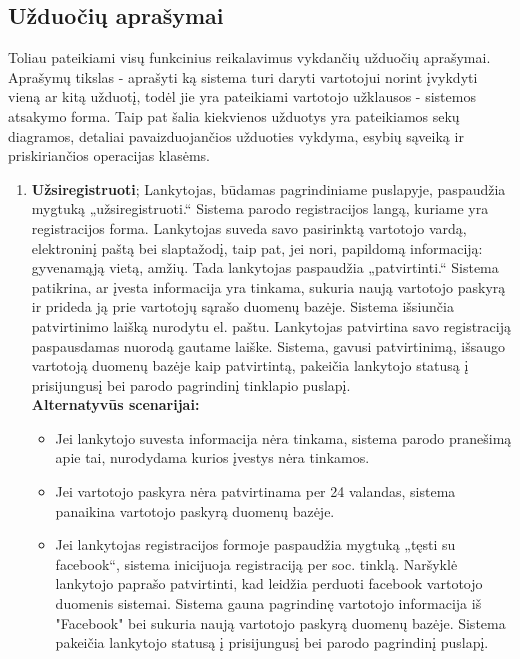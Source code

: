 \documentclass{VUMIFPSkursinis}
\begin{document}
	\subsection{Užduočių aprašymai}
		Toliau pateikiami visų funkcinius reikalavimus vykdančių užduočių aprašymai. 
		Aprašymų tikslas - aprašyti ką sistema turi daryti vartotojui norint įvykdyti vieną ar kitą užduotį,
		todėl jie yra pateikiami vartotojo užklausos - sistemos atsakymo forma.
		Taip pat šalia kiekvienos užduotys yra pateikiamos sekų diagramos,
		detaliai pavaizduojančios užduoties vykdyma, esybių sąveiką ir priskiriančios
		operacijas klasėms.
		\begin{enumerate}[label=\textbf{U\arabic*.}]
			\item \textbf{Užsiregistruoti};		
				Lankytojas, būdamas pagrindiniame puslapyje, paspaudžia mygtuką „užsiregistruoti.“ Sistema parodo registracijos langą, kuriame yra registracijos forma.
				Lankytojas suveda savo pasirinktą vartotojo vardą, elektroninį paštą bei slaptažodį, taip pat, jei nori, 
				papildomą informaciją: gyvenamąją vietą, amžių. Tada lankytojas paspaudžia „patvirtinti.“ 
				Sistema patikrina, ar įvesta informacija yra tinkama, sukuria naują vartotojo paskyrą ir prideda ją prie vartotojų sąrašo duomenų bazėje.
				Sistema išsiunčia patvirtinimo laišką nurodytu el. paštu. 
				Lankytojas patvirtina savo registraciją paspausdamas nuorodą gautame laiške. Sistema, gavusi patvirtinimą, išsaugo vartotoją duomenų bazėje kaip patvirtintą,
				pakeičia lankytojo statusą į prisijungusį bei parodo pagrindinį tinklapio puslapį.\\
				\textbf{Alternatyvūs scenarijai:}
				\begin{itemize}
					\item Jei lankytojo suvesta informacija nėra tinkama, sistema parodo pranešimą apie tai, nurodydama kurios įvestys nėra tinkamos.
					\item Jei vartotojo paskyra nėra patvirtinama per 24 valandas, sistema panaikina vartotojo paskyrą duomenų bazėje.
					\item Jei lankytojas registracijos formoje paspaudžia mygtuką „tęsti su facebook“, sistema inicijuoja registraciją per soc. tinklą.
	                    Naršyklė lankytojo paprašo patvirtinti, kad leidžia perduoti facebook vartotojo duomenis sistemai.
						Sistema gauna pagrindinę vartotojo informacija iš "Facebook" bei sukuria naują vartotojo paskyrą duomenų bazėje.
						Sistema pakeičia lankytojo statusą į prisijungusį bei parodo pagrindinį puslapį.

\end{itemize}
\end{enumerate}
\end{document}

